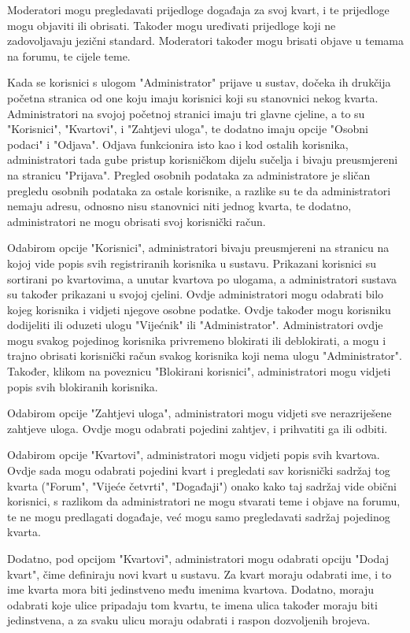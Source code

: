 	Moderatori mogu pregledavati prijedloge događaja za svoj kvart, i te prijedloge mogu objaviti ili obrisati. Također mogu uređivati prijedloge koji ne zadovoljavaju jezični standard. Moderatori također mogu brisati objave u temama na forumu, te cijele teme.
	
	Kada se korisnici s ulogom "Administrator" prijave u sustav, dočeka ih drukčija početna stranica od one koju imaju korisnici koji su stanovnici nekog kvarta. Administratori na svojoj početnoj stranici imaju tri glavne cjeline, a to su "Korisnici", "Kvartovi", i "Zahtjevi uloga", te dodatno imaju opcije "Osobni podaci" i "Odjava". Odjava funkcionira isto kao i kod ostalih korisnika, administratori tada gube pristup korisničkom dijelu sučelja i bivaju preusmjereni na stranicu "Prijava". Pregled osobnih podataka za administratore je sličan pregledu osobnih podataka za ostale korisnike, a razlike su te da administratori nemaju adresu, odnosno nisu stanovnici niti jednog kvarta, te dodatno, administratori ne mogu obrisati svoj korisnički račun.
	
	Odabirom opcije "Korisnici", administratori bivaju preusmjereni na stranicu na kojoj vide popis svih registriranih korisnika u sustavu. Prikazani korisnici su sortirani po kvartovima, a unutar kvartova po ulogama, a administratori sustava su također prikazani u svojoj cjelini. Ovdje administratori mogu odabrati bilo kojeg korisnika i vidjeti njegove osobne podatke. Ovdje također mogu korisniku dodijeliti ili oduzeti ulogu "Vijećnik" ili "Administrator". Administratori ovdje mogu svakog pojedinog korisnika privremeno blokirati ili deblokirati, a mogu i trajno obrisati korisnički račun svakog korisnika koji nema ulogu "Administrator". Također, klikom na poveznicu "Blokirani korisnici", administratori mogu vidjeti popis svih blokiranih korisnika.
	
	Odabirom opcije "Zahtjevi uloga", administratori mogu vidjeti sve nerazriješene zahtjeve uloga. Ovdje mogu odabrati pojedini zahtjev, i prihvatiti ga ili odbiti. 
	
	Odabirom opcije "Kvartovi", administratori mogu vidjeti popis svih kvartova. Ovdje sada mogu odabrati pojedini kvart i pregledati sav korisnički sadržaj tog kvarta ("Forum", "Vijeće četvrti", "Događaji") onako kako taj sadržaj vide obični korisnici, s razlikom da administratori ne mogu stvarati teme i objave na forumu, te ne mogu predlagati događaje, već mogu samo pregledavati sadržaj pojedinog kvarta.
	
	Dodatno, pod opcijom "Kvartovi", administratori mogu odabrati opciju "Dodaj kvart", čime definiraju novi kvart u sustavu. Za kvart moraju odabrati ime, i to ime kvarta mora biti jedinstveno među imenima kvartova. Dodatno, moraju odabrati koje ulice pripadaju tom kvartu, te imena ulica također moraju biti jedinstvena, a za svaku ulicu moraju odabrati i raspon dozvoljenih brojeva.
	
